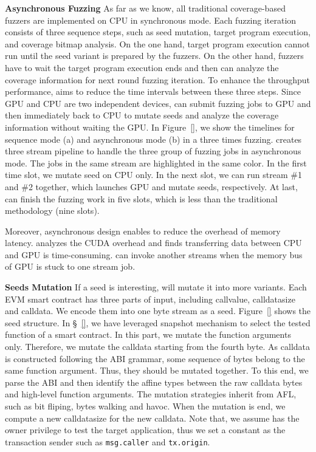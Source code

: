 \noindent \textbf{Asynchronous Fuzzing}
\label{design:asynchronous}
As far as we know, all traditional coverage-based fuzzers are implemented on CPU in synchronous mode. Each fuzzing iteration consists of three sequence steps, such as seed mutation, target program execution, and coverage bitmap analysis. 
On the one hand, target program execution cannot run until the seed variant is prepared by the fuzzers. 
On the other hand, fuzzers have to wait the target program execution ends and then can analyze the coverage information for next round fuzzing iteration. 
To enhance the throughput performance, {\tool} aims to reduce the time intervals between these three steps.
Since GPU and CPU are two independent devices, {\runner} can submit fuzzing jobs to GPU and then immediately back to CPU to mutate seeds and analyze the coverage information without waiting the GPU. 
In Figure~\ref{}, we show the timelines for sequence mode (a) and asynchronous mode (b) in a three times fuzzing. 
{\tool} creates three stream pipeline to handle the three group of fuzzing jobs in asynchronous mode. 
The jobs in the same stream are highlighted in the same color. 
In the first time slot, we mutate seed on CPU only. In the next slot, we can run stream \#1 and \#2 together, which launches GPU and mutate seeds, respectively. At last, {\tool} can finish the fuzzing work in five slots, which is less than the traditional methodology (nine slots).

Moreover, asynchronous design enables {\tool} to reduce the overhead of memory latency. \cite{} analyzes the CUDA overhead and finds transferring data between CPU and GPU is time-consuming. {\tool} can invoke another streams when the memory bus of GPU is stuck to one stream job. 


\noindent \textbf{Seeds Mutation}
\label{design:mutation}
If a seed is interesting, {\runner} will mutate it into more variants. 
Each EVM smart contract has three parts of input, including callvalue, calldatasize and calldata. We encode them into one byte stream as a seed. Figure~\ref{} shows the seed structure. 
In \S~\ref{}, we have leveraged snapshot mechanism to select the tested function of a smart contract. In this part, we mutate the function arguments only. Therefore, we mutate the calldata starting from the fourth byte. 
As calldata is constructed following the ABI grammar, some sequence of bytes belong to the same function argument. Thus, they should be mutated together.
To this end, we parse the ABI and then identify the affine types between the raw calldata bytes and high-level function arguments. 
The mutation strategies inherit from AFL, such as bit fliping, bytes walking and havoc\cite{afl}. 
When the mutation is end, we compute a new calldatasize for the new calldata. 
Note that, we assume {\tool} has the owner privilege to test the target application, thus we set a constant as the transaction sender such as \texttt{msg.caller} and \texttt{tx.origin}.

